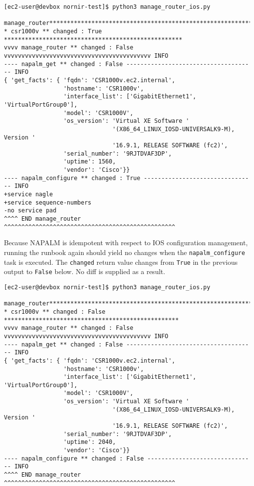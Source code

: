 \begin{verbatim}
[ec2-user@devbox nornir-test]$ python3 manage_router_ios.py

manage_router***********************************************************
* csr1000v ** changed : True ***************************************************
vvvv manage_router ** changed : False vvvvvvvvvvvvvvvvvvvvvvvvvvvvvvvvvvvvvvvvvv INFO
---- napalm_get ** changed : False ------------------------------------- INFO
{ 'get_facts': { 'fqdn': 'CSR1000v.ec2.internal',
                 'hostname': 'CSR1000v',
                 'interface_list': ['GigabitEthernet1', 'VirtualPortGroup0'],
                 'model': 'CSR1000V',
                 'os_version': 'Virtual XE Software '
                               '(X86_64_LINUX_IOSD-UNIVERSALK9-M), Version '
                               '16.9.1, RELEASE SOFTWARE (fc2)',
                 'serial_number': '9RJTDVAF3DP',
                 'uptime': 1560,
                 'vendor': 'Cisco'}}
---- napalm_configure ** changed : True -------------------------------- INFO
+service nagle
+service sequence-numbers
-no service pad
^^^^ END manage_router ^^^^^^^^^^^^^^^^^^^^^^^^^^^^^^^^^^^^^^^^^^^^^^^^^
\end{verbatim}

Because NAPALM is idempotent with respect to IOS configuration management,
running the runbook again should yield no changes when the
\verb|napalm_configure| task is executed. The \verb|changed| return value
changes from \verb|True| in the previous output to \verb|False| below. No diff
is supplied as a result.

\begin{verbatim}
[ec2-user@devbox nornir-test]$ python3 manage_router_ios.py

manage_router***********************************************************
* csr1000v ** changed : False **************************************************
vvvv manage_router ** changed : False vvvvvvvvvvvvvvvvvvvvvvvvvvvvvvvvvvvvvvvvvv INFO
---- napalm_get ** changed : False ------------------------------------- INFO
{ 'get_facts': { 'fqdn': 'CSR1000v.ec2.internal',
                 'hostname': 'CSR1000v',
                 'interface_list': ['GigabitEthernet1', 'VirtualPortGroup0'],
                 'model': 'CSR1000V',
                 'os_version': 'Virtual XE Software '
                               '(X86_64_LINUX_IOSD-UNIVERSALK9-M), Version '
                               '16.9.1, RELEASE SOFTWARE (fc2)',
                 'serial_number': '9RJTDVAF3DP',
                 'uptime': 2040,
                 'vendor': 'Cisco'}}
---- napalm_configure ** changed : False ------------------------------- INFO
^^^^ END manage_router ^^^^^^^^^^^^^^^^^^^^^^^^^^^^^^^^^^^^^^^^^^^^^^^^^
\end{verbatim}

